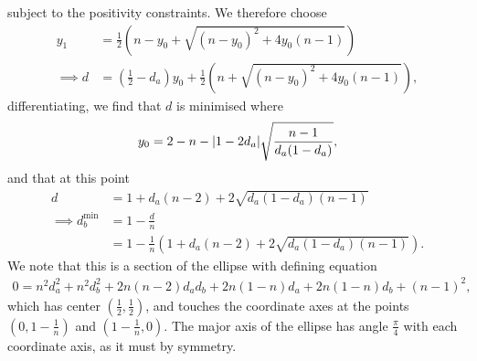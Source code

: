 subject to the positivity constraints. We therefore choose
\begin{align}
  y_1 &= \frac{1}{2}\left(n-y_0 + \sqrt{(n-y_0)^2 + 4y_0(n-1)}\right)\\
  \implies d &= \left(\frac{1}{2} - d_a\right)y_0 + \frac{1}{2}\left(n+\sqrt{(n-y_0)^2 + 4y_0(n-1)}\right),
\end{align}
differentiating, we find that $d$ is minimised where
\begin{align}
  y_0 = 2-n - {\left\lvert{1-2d_a}\right\rvert}\sqrt{\frac{n-1}{d_a(1-d_a)}},
\end{align}
and that at this point 
\begin{align}
  d &= 1 + d_a(n-2) + 2\sqrt{d_a(1-d_a)(n-1)}\\
  \implies d_b^{\text{min}} &= 1- \frac{d}{n}\\
    &= 1 -  \frac{1}{n}\left(1 + d_a(n-2) + 2\sqrt{d_a(1-d_a)(n-1)}\right).
\end{align}
We note that this is a section of the ellipse with defining equation
\begin{align}
0 = n^2d_a^2 + n^2 d_b^2 + 2n(n-2)d_ad_b + 2n(1-n)d_a + 2n(1-n)d_b  + (n-1)^2,
  \label{eqn:ellipse-defining-equation}
\end{align}
which has center $\left(\frac{1}{2}, \frac{1}{2}\right)$, and touches the coordinate axes at the points $\left(0, 1-\frac{1}{n}\right)$ and $\left(1-\frac{1}{n}, 0\right)$. The major axis of the ellipse has angle $\frac{\pi}{4}$ with each coordinate axis, as it must by symmetry.

